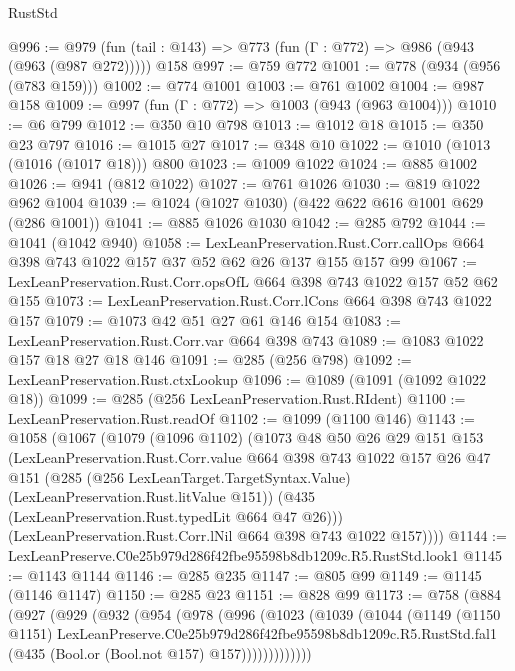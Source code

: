 \begin{lexlean}{RustStd}
\begin{coremodule}
@996 := @979 (fun (tail : @143) => @773 (fun (Γ : @772) => @986 (@943 (@963 (@987 @272))))) @158
@997 := @759 @772
@1001 := @778 (@934 (@956 (@783 @159)))
@1002 := @774 @1001
@1003 := @761 @1002
@1004 := @987 @158
@1009 := @997 (fun (Γ : @772) => @1003 (@943 (@963 @1004)))
@1010 := @6 @799
@1012 := @350 @10 @798
@1013 := @1012 @18
@1015 := @350 @23 @797
@1016 := @1015 @27
@1017 := @348 @10
@1022 := @1010 (@1013 (@1016 (@1017 @18))) @800
@1023 := @1009 @1022
@1024 := @885 @1002
@1026 := @941 (@812 @1022)
@1027 := @761 @1026
@1030 := @819 @1022 @962 @1004
@1039 := @1024 (@1027 @1030) (@422 @622 @616 @1001 @629 (@286 @1001))
@1041 := @885 @1026 @1030
@1042 := @285 @792
@1044 := @1041 (@1042 @940)
@1058 := LexLeanPreservation.Rust.Corr.callOps
    @664
    @398
    @743
    @1022
    @157
    @37
    @52
    @62
    @26
    @137
    @155
    @157
    @99
@1067 := LexLeanPreservation.Rust.Corr.opsOfL @664 @398 @743 @1022 @157 @52 @62 @155
@1073 := LexLeanPreservation.Rust.Corr.lCons @664 @398 @743 @1022 @157
@1079 := @1073 @42 @51 @27 @61 @146 @154
@1083 := LexLeanPreservation.Rust.Corr.var @664 @398 @743
@1089 := @1083 @1022 @157 @18 @27 @18 @146
@1091 := @285 (@256 @798)
@1092 := LexLeanPreservation.Rust.ctxLookup
@1096 := @1089 (@1091 (@1092 @1022 @18))
@1099 := @285 (@256 LexLeanPreservation.Rust.RIdent)
@1100 := LexLeanPreservation.Rust.readOf
@1102 := @1099 (@1100 @146)
@1143 := @1058
    (@1067
      (@1079
        (@1096 @1102)
        (@1073
          @48
          @50
          @26
          @29
          @151
          @153
          (LexLeanPreservation.Rust.Corr.value
            @664
            @398
            @743
            @1022
            @157
            @26
            @47
            @151
            (@285 (@256 LexLeanTarget.TargetSyntax.Value) (LexLeanPreservation.Rust.litValue @151))
            (@435 (LexLeanPreservation.Rust.typedLit @664 @47 @26)))
          (LexLeanPreservation.Rust.Corr.lNil @664 @398 @743 @1022 @157))))
@1144 := LexLeanPreserve.C0e25b979d286f42fbe95598b8db1209c.R5.RustStd.look1
@1145 := @1143 @1144
@1146 := @285 @235
@1147 := @805 @99
@1149 := @1145 (@1146 @1147)
@1150 := @285 @23
@1151 := @828 @99
@1173 := @758
    (@884
      (@927
        (@929
          (@932
            (@954
              (@978
                (@996
                  (@1023
                    (@1039
                      (@1044
                        (@1149
                          (@1150 @1151)
                          LexLeanPreserve.C0e25b979d286f42fbe95598b8db1209c.R5.RustStd.fal1
                          (@435 (Bool.or (Bool.not @157) @157)))))))))))))

\end{coremodule}
\end{lexlean}
